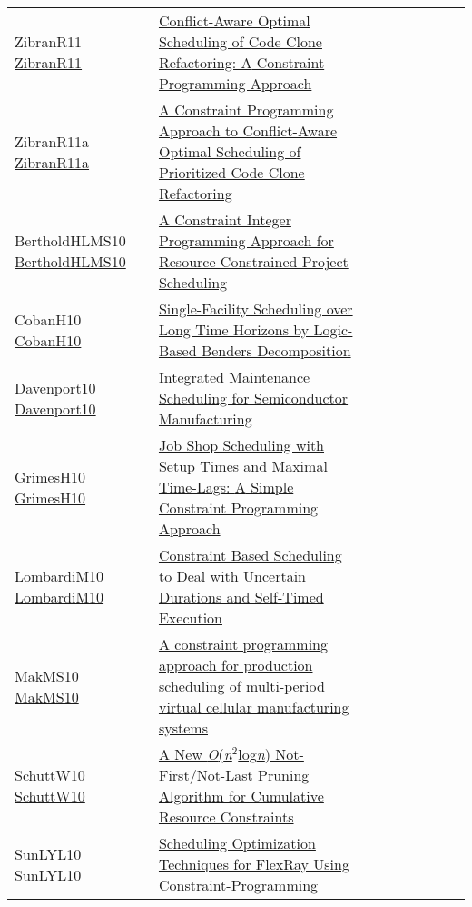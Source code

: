 {\begin{longtable}{p{3cm}p{7cm}lllllll}
ZibranR11 \href{https://doi.org/10.1109/ICPC.2011.45}{ZibranR11} &  \href{papers/ZibranR11.pdf}{Conflict-Aware Optimal Scheduling of Code Clone Refactoring: {A} Constraint Programming Approach} &  &  &  &  &  &  & \\
ZibranR11a \href{https://doi.org/10.1109/SCAM.2011.21}{ZibranR11a} &  \href{papers/ZibranR11a.pdf}{A Constraint Programming Approach to Conflict-Aware Optimal Scheduling of Prioritized Code Clone Refactoring} &  &  &  &  &  &  & \\
BertholdHLMS10 \href{https://doi.org/10.1007/978-3-642-13520-0\_34}{BertholdHLMS10} &  \href{papers/BertholdHLMS10.pdf}{A Constraint Integer Programming Approach for Resource-Constrained Project Scheduling} &  &  &  &  &  &  & \\
CobanH10 \href{https://doi.org/10.1007/978-3-642-13520-0\_11}{CobanH10} &  \href{papers/CobanH10.pdf}{Single-Facility Scheduling over Long Time Horizons by Logic-Based Benders Decomposition} &  &  &  &  &  &  & \\
Davenport10 \href{https://doi.org/10.1007/978-3-642-13520-0\_12}{Davenport10} &  \href{papers/Davenport10.pdf}{Integrated Maintenance Scheduling for Semiconductor Manufacturing} &  &  &  &  &  &  & \\
GrimesH10 \href{https://doi.org/10.1007/978-3-642-13520-0\_19}{GrimesH10} &  \href{papers/GrimesH10.pdf}{Job Shop Scheduling with Setup Times and Maximal Time-Lags: {A} Simple Constraint Programming Approach} &  &  &  &  &  &  & \\
LombardiM10 \href{https://doi.org/10.1007/978-3-642-15396-9\_32}{LombardiM10} &  \href{papers/LombardiM10.pdf}{Constraint Based Scheduling to Deal with Uncertain Durations and Self-Timed Execution} &  &  &  &  &  &  & \\
MakMS10 \href{https://doi.org/10.1109/ICNC.2010.5583494}{MakMS10} &  \href{papers/MakMS10.pdf}{A constraint programming approach for production scheduling of multi-period virtual cellular manufacturing systems} &  &  &  &  &  &  & \\
SchuttW10 \href{https://doi.org/10.1007/978-3-642-15396-9\_36}{SchuttW10} &  \href{papers/SchuttW10.pdf}{A New \emph{O}(\emph{n}\({}^{\mbox{2}}\)log\emph{n}) Not-First/Not-Last Pruning Algorithm for Cumulative Resource Constraints} &  &  &  &  &  &  & \\
SunLYL10 \href{https://doi.org/10.1109/GreenCom-CPSCom.2010.111}{SunLYL10} &  \href{papers/SunLYL10.pdf}{Scheduling Optimization Techniques for FlexRay Using Constraint-Programming} &  &  &  &  &  &  & \\

\end{longtable}}
